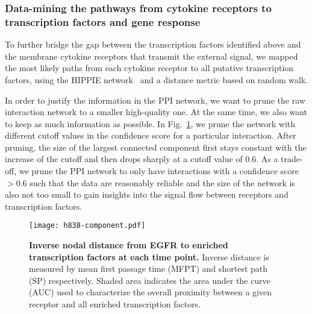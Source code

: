 \subsubsection{Data-mining the pathways from cytokine receptors to transcription factors and gene response}

To further bridge the gap between the transcription factors identified above and the membrane cytokine receptors that 
transmit the external signal,
we mapped the most likely paths from each cytokine receptor to all putative 
transcription factors, using the HIPPIE network~\citep{Schaefer2012} and a 
distance metric based on random walk.

In order to justify the information in the PPI network, we want to prune the
raw interaction network to a smaller
high-quality one. At the same time, we also want to keep as 
much information as possible. In Fig.~\ref{fig:h838_component}, we prune the 
network with different cutoff values in the confidence score for a particular
interaction. After pruning, the
size of the largest connected component first stays constant with the increase 
of the cutoff and then drops
sharply at a cutoff value of 0.6. As a trade-off, we prune the PPI network
to only have interactions with a confidence score $>0.6$ such that the data
are reasonably reliable and the size of the network is also not too small to
gain insights into the signal flow between receptors and transcription factors.

\begin{figure}[!ht]
\begin{center}
\texttt{[image: h838-component.pdf]}
\end{center}
\caption[Confidence score cutoff]{
{\bf Inverse nodal distance from EGFR to enriched 
transcription factors at each time point.} 
Inverse distance is measured by mean first passage time
(MFPT) and shortest path (SP) respectively. Shaded area
indicates the area under the curve (AUC) used to 
characterize the overall proximity between a given
receptor and all enriched transcription factors.
}
\label{fig:h838_component}
\end{figure}

